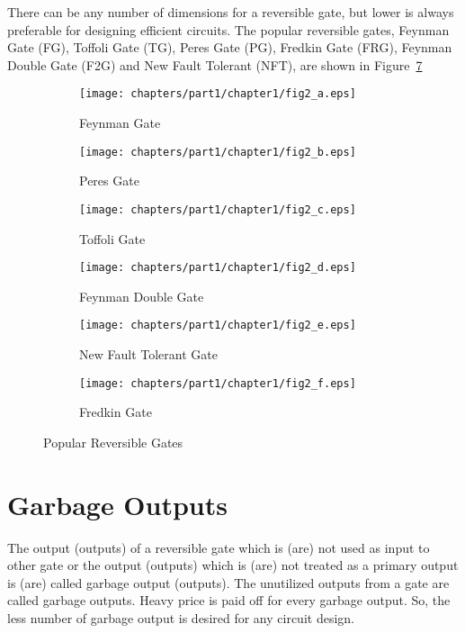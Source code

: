 \begin{example}\textnormal{
There can be any number of dimensions for a reversible gate, but lower  is always preferable for designing efficient circuits. The popular reversible gates, Feynman Gate (FG), Toffoli Gate (TG), Peres Gate (PG), Fredkin Gate (FRG), Feynman Double Gate (F2G) and New Fault Tolerant (NFT), are shown in Figure~\ref{fig:p1_c1_fig2}}
\end{example}
\begin{figure}[H]
\centering
\begin{subfigure}[b]{0.30\textwidth}
\centering
\texttt{[image: chapters/part1/chapter1/fig2\_a.eps]}
\caption{Feynman Gate}
\label{fig:p1_c1_fig2_a}
\end{subfigure}
\begin{subfigure}[b]{0.30\textwidth}
\centering
\texttt{[image: chapters/part1/chapter1/fig2\_b.eps]}
\caption{Peres Gate}
\label{fig:p2_c1_fig2_b}
\end{subfigure}
\begin{subfigure}[b]{0.30\textwidth}
\centering
\texttt{[image: chapters/part1/chapter1/fig2\_c.eps]}
\caption{Toffoli Gate}
\label{fig:p1_c1_fig2_c}
\end{subfigure}

\begin{subfigure}[b]{0.30\textwidth}
\centering
\texttt{[image: chapters/part1/chapter1/fig2\_d.eps]}
\caption{Feynman Double Gate}
\label{fig:p1_c1_fig2_d}
\end{subfigure}
\begin{subfigure}[b]{0.30\textwidth}
\centering
\texttt{[image: chapters/part1/chapter1/fig2\_e.eps]}
\caption{New Fault Tolerant Gate}
\label{fig:p1_c1_fig2_e}
\end{subfigure}
\begin{subfigure}[b]{0.30\textwidth}
\centering
\texttt{[image: chapters/part1/chapter1/fig2\_f.eps]}
\caption{Fredkin Gate}
\label{fig:p1_c1_fig2_f}
\end{subfigure}
\caption{Popular Reversible Gates}
\label{fig:p1_c1_fig2}
\end{figure}

\section{Garbage Outputs}

The output (outputs) of a reversible gate which is (are) not used as input to other gate or the output (outputs) which is (are) not treated as a primary output is (are) called garbage output (outputs). The unutilized outputs
from a gate are called garbage outputs. Heavy price is paid
oﬀ for every garbage output. So, the less number of garbage output is desired for any circuit design.


